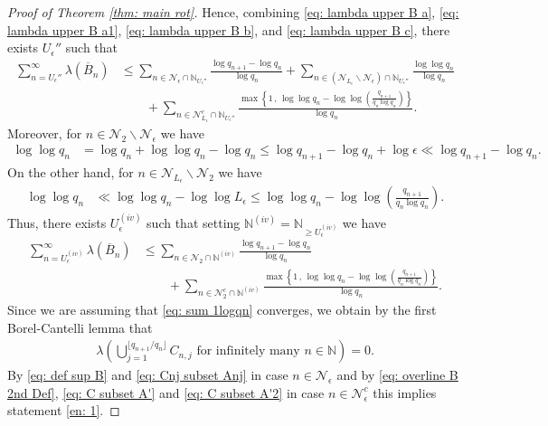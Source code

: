 \documentclass[11pt]{amsart}
\theoremstyle{definition}
\numberwithin{equation}{section}
\begin{document}
\begin{proof}[Proof of Theorem \ref{thm: main rot}]
Hence, combining \eqref{eq: lambda upper B a}, \eqref{eq: lambda upper B a1}, \eqref{eq: lambda upper B b}, and \eqref{eq: lambda upper B c}, there exists $U_{\epsilon}''$ such that 
\begin{align*}
 \sum_{n=U_{\epsilon}''}^{\infty} \lambda\left(\overline{B}_n\right)
 &\leq \sum_{n\in \mathcal{N}_{\epsilon}\cap \mathbb{N}_{U_{\epsilon}''}} \frac{\log q_{n+1}-\log q_n}{\log q_n}
 +\sum_{n\in (\mathcal{N}_{L_\epsilon}\backslash \mathcal{N}_{\epsilon})\cap \mathbb{N}_{U_{\epsilon}''}} \frac{\log\log q_n}{\log q_n}\\
 &\qquad +\sum_{n\in \mathcal{N}_{L_\epsilon}^c\cap \mathbb{N}_{U_{\epsilon}''}}\frac{\max\left\{1\, ,\, \log\log q_n -\log\log \left(\frac{q_{n+1}}{q_n\log q_n}\right) \right\}}{\log q_n}.
\end{align*}
Moreover, for $n\in \mathcal{N}_2\backslash \mathcal{N}_{\epsilon}$ we have 
\begin{align*}
 \log\log q_n
 &= \log q_n+\log\log q_n-\log q_n
 \leq \log q_{n+1}-\log q_n+\log \epsilon \ll \log q_{n+1}-\log q_n.
\end{align*}
On the other hand, for $n\in \mathcal{N}_{L_{\epsilon}}\backslash \mathcal{N}_{2}$ we have  
\begin{align*}
 \log\log q_n &\ll \log\log q_n-\log\log L_\epsilon 
 \leq  \log\log q_n -\log\log \left(\frac{q_{n+1}}{q_n\log q_n}\right).
\end{align*}
Thus, there exists $U_{\epsilon}^{(iv)}$ such that setting $\mathbb{N}^{(iv)}=\mathbb{N}_{\geq U_{\epsilon}^{(iv)}}$ we have
\begin{align*}
 \sum_{n=U_{\epsilon}^{(iv)}}^{\infty} \lambda\left(\overline{B}_n\right)
 &\leq \sum_{n\in \mathcal{N}_2\cap \mathbb{N}^{(iv)}} \frac{\log q_{n+1}-\log q_n}{\log q_n}\\ 
 &\qquad +\sum_{n\in \mathcal{N}_{2}^c\cap\mathbb{N}^{(iv)}}\frac{\max\left\{1\, ,\, \log\log q_n -\log\log \left(\frac{q_{n+1}}{q_n\log q_n}\right) \right\}}{\log q_n}.
\end{align*}
Since we are assuming that \eqref{eq: sum 1logqn} converges, we obtain by the first Borel-Cantelli lemma that 
\begin{align*}
 \lambda \left( \bigcup_{j=1}^{\lfloor q_{n+1}/q_n\rfloor} C_{n,j}\text{ for infinitely many }n\in\mathbb{N}\right)=0. 
\end{align*}
By \eqref{eq: def sup B} and \eqref{eq: Cnj subset Anj} in case $n\in\mathcal{N}_{\epsilon}$ and by \eqref{eq: overline B 2nd Def}, \eqref{eq: C subset A'} and \eqref{eq: C subset A'2} in case $n\in \mathcal{N}_{\epsilon}^c$
this implies statement \eqref{en: 1}. 
\newline 


\end{proof}
\end{document}
